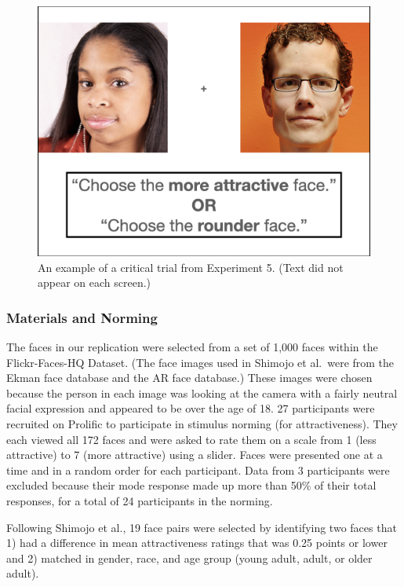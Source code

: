 \documentclass[
  man,floatsintext]{apa6}
\begin{document}
\begin{figure}
\centering
\includegraphics{group-e/E5-example-figure.jpeg}
\caption{\label{fig:E5-example-trial}An example of a critical trial from Experiment 5. (Text did not appear on each screen.)}
\end{figure}

\subsubsection{Materials and Norming}\label{materials-and-norming}

The faces in our replication were selected from a set of 1,000 faces
within the Flickr-Faces-HQ Dataset. (The face images used in Shimojo et
al.~were from the Ekman face database and the AR face database.) These
images were chosen because the person in each image was looking at the
camera with a fairly neutral facial expression and appeared to be over
the age of 18. 27 participants were recruited on Prolific to participate
in stimulus norming (for attractiveness). They each viewed all 172 faces and were asked to rate
them on a scale from 1 (less attractive) to 7 (more attractive) using a
slider. Faces were presented one at a time and in a random order for
each participant. Data from 3 participants were excluded because
their mode response made up more than 50\% of their total responses, for a total of 24 participants
in the norming.

Following Shimojo et al., 19 face pairs were selected by
identifying two faces that 1) had a difference in mean attractiveness ratings
that was 0.25 points or lower and 2) matched in gender, race, and age
group (young adult, adult, or older adult).
\end{document}

